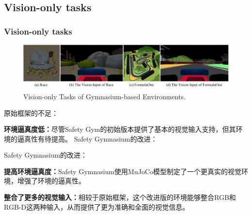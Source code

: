 \documentclass[10pt,mathserif]{beamer}%
\begin{document}
\subsection{Vision-only tasks}
\begin{frame}[t,fragile]
    \frametitle{Vision-only tasks}
\begin{figure}[ht]
  \centering
  \includegraphics[width=0.9\linewidth]{Safety-Gymnasium/assets/main-paper/vision-task.pdf}
  \caption{Vision-only Tasks of Gymnasium-based Environments.}
  \label{pic:agent}
\end{figure}
\vspace{-0.5cm}
\begin{spacing}{1.2}
原始框架的不足：
\begin{itemize}
{
\fontsize{8pt}{9.6pt}\selectfont
   
    \item \textbf{环境逼真度低：}尽管Safety Gym的初始版本提供了基本的视觉输入支持，但其环境的逼真性有待提高。
Safety Gymnasium的改进：
}
\end{itemize}
Safety Gymnasium的改进：
\begin{itemize}
{
\fontsize{8pt}{9.6pt}\selectfont
   
       \item \textbf{提高环境逼真度：}Safety Gymnasium使用MuJoCo模型制定了一个更真实的视觉环境，增强了环境的逼真性。
    \item \textbf{整合了更多的视觉输入：}相较于原始框架，这个改进版的环境能够整合RGB和RGB-D这两种输入，从而提供了更为准确和全面的视觉信息。
}
\end{itemize}
\end{spacing}
\end{frame}
\end{document}

